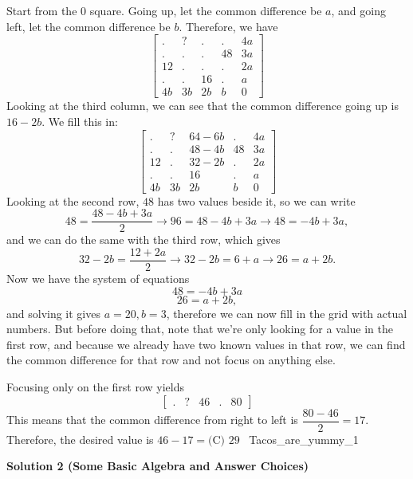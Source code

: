 \begin{enumerate}
Start from the $0$ square. Going up, let the common difference be $a$, and going left, let the common difference be $b$. Therefore, we have 
 \[\begin{bmatrix} . & ? &.&.&4a \\ .&.&.&48&3a\\ 12&.&.&.&2a\\ .&.&16&.&a\\ 4b&3b&2b&b&0\end{bmatrix}\] Looking at the third column, we can see that the common difference going up is $16-2b$. We fill this in: 
 \[\begin{bmatrix} . & ? &64-6b&.&4a \\ .&.&48-4b&48&3a\\ 12&.&32-2b&.&2a\\ .&.&16&.&a\\ 4b&3b&2b&b&0\end{bmatrix}\] Looking at the second row, $48$ has two values beside it, so we can write 
 \[48=\dfrac{48-4b+3a}{2}\rightarrow96=48-4b+3a\rightarrow48=-4b+3a,\] and we can do the same with the third row, which gives 
 \[32-2b=\dfrac{12+2a}{2}\rightarrow32-2b=6+a\rightarrow26=a+2b.\] Now we have the system of equations 
 \[48=-4b+3a\]
 \[26=a+2b,\] and solving it gives $a=20,b=3$, therefore we can now fill in the grid with actual numbers. But before doing that, note that we're only looking for a value in the first row, and because we already have two known values in that row, we can find the common difference for that row and not focus on anything else. 

 Focusing only on the first row yields 
 \[\begin{bmatrix} . & ? &46&.&80\end{bmatrix}\] This means that the common difference from right to left is $\dfrac{80-46}{2}=17$. Therefore, the desired value is $46-17=\boxed{\text{(C) }29}$ ~Tacos\_are\_yummy\_1

 



\textbf{Solution 2 (Some Basic Algebra and Answer Choices)}


\end{enumerate}
